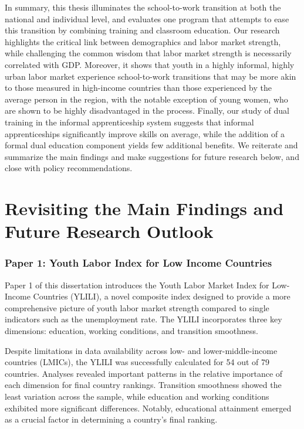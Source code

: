 \documentclass[
  a4paper, twoside, 12pt]{book}
\renewcommand{\hl}[1]{#1}
\begin{document}
\hl{In summary, this thesis illuminates the school-to-work transition at both the national and individual level, and evaluates one program that attempts to ease this transition by combining training and classroom education. Our research highlights the critical link between demographics and labor market strength, while challenging the common wisdom that labor market strength is necessarily correlated with GDP. Moreover, it shows that youth in a highly informal, highly urban labor market experience school-to-work transitions that may be more akin to those measured in high-income countries than those experienced by the average person in the region, with the notable exception of young women, who are shown to be highly disadvantaged in the process. Finally, our study of dual training in the informal apprenticeship system suggests that informal apprenticeships significantly improve skills on average, while the addition of a formal dual education component yields few additional benefits. We reiterate and summarize the main findings and make suggestions for future research below, and close with policy recommendations.}

\hypertarget{section-5}{%
\section{\texorpdfstring{\hl{Revisiting the Main Findings and Future Research Outlook}}{}}\label{section-5}}

\hypertarget{section-6}{%
\subsubsection*{\texorpdfstring{\hl{Paper 1: Youth Labor Index for Low Income Countries}}{}}\label{section-6}}

\hl{Paper 1 of this dissertation introduces the Youth Labor Market Index for Low-Income Countries (YLILI), a novel composite index designed to provide a more comprehensive picture of youth labor market strength compared to single indicators such as the unemployment rate. The YLILI incorporates three key dimensions: education, working conditions, and transition smoothness.}

\hl{Despite limitations in data availability across low- and lower-middle-income countries (LMICs), the YLILI was successfully calculated for 54 out of 79 countries. Analyses revealed important patterns in the relative importance of each dimension for final country rankings. Transition smoothness showed the least variation across the sample, while education and working conditions exhibited more significant differences. Notably, educational attainment emerged as a crucial factor in determining a country's final ranking.}
\end{document}
